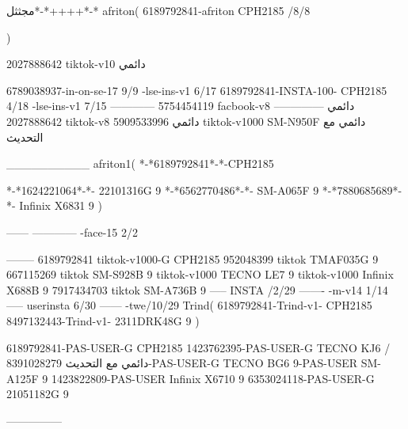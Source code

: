 مجثثل*-*++++*-*
afriton(
6189792841-afriton CPH2185  /8/8

)

2027888642 tiktok-v10
دائمي

6789038937-in-on-se-17 9/9
-lse-ins-v1 6/17
6189792841-INSTA-100- CPH2185 4/18
-lse-ins-v1 7/15
------------
5754454119 facbook-v8
دائمي
--------------
2027888642 tiktok-v8
دائمي
5909533996 tiktok-v1000  SM-N950F
دائمي مع التحديث

__________
afriton1(
*-*6189792841*-*-CPH2185

*-*1624221064*-*- 22101316G   9\9
*-*6562770486*-*- SM-A065F   9
*-*7880685689*-*- Infinix X6831   9
)


------
------------
-face-15 2/2

--------
6189792841 tiktok-v1000-G CPH2185 
952048399 tiktok TMAF035G 9
667115269 tiktok  SM-S928B  9 tiktok-v1000  TECNO LE7  9 tiktok-v1000  Infinix X688B  9
7917434703 tiktok  SM-A736B  9
-----
 INSTA /2/29
-------
-m-v14 1/14
-----
userinsta 6/30
------
-twe/10/29
Trind(
6189792841-Trind-v1- CPH2185 
8497132443-Trind-v1- 2311DRK48G  9
)


6189792841-PAS-USER-G CPH2185 
1423762395-PAS-USER-G TECNO KJ6  /دائمي مع التحديث
8391028279-PAS-USER-G  TECNO BG6  9-PAS-USER  SM-A125F  9
1423822809-PAS-USER   Infinix X6710  9
6353024118-PAS-USER-G   21051182G  9

    ---------------
